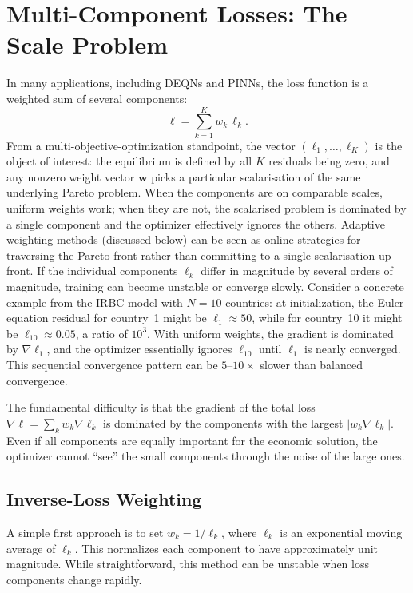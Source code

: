 \documentclass[11pt,a4paper]{report}
\begin{document}
\section{Multi-Component Losses: The Scale Problem}

In many applications, including DEQNs and PINNs, the loss function is a weighted sum of several components:
\begin{equation}
\ell = \sum_{k=1}^{K} w_k \, \ell_k.
\end{equation}
From a multi-objective-optimization standpoint, the vector $(\ell_1, \dots, \ell_K)$ is the object of interest: the equilibrium is defined by all $K$ residuals being zero, and any nonzero weight vector $\bm{w}$ picks a particular scalarisation of the same underlying Pareto problem.  When the components are on comparable scales, uniform weights work; when they are not, the scalarised problem is dominated by a single component and the optimizer effectively ignores the others.  Adaptive weighting methods (discussed below) can be seen as online strategies for traversing the Pareto front rather than committing to a single scalarisation up front.
If the individual components $\ell_k$ differ in magnitude by several orders of magnitude, training can become unstable or converge slowly.  Consider a concrete example from the IRBC model with $N=10$ countries: at initialization, the Euler equation residual for country~1 might be $\ell_1 \approx 50$, while for country~10 it might be $\ell_{10} \approx 0.05$, a ratio of $10^3$.  With uniform weights, the gradient is dominated by $\nabla \ell_1$, and the optimizer essentially ignores $\ell_{10}$ until $\ell_1$ is nearly converged.  This sequential convergence pattern can be $5$--$10\times$ slower than balanced convergence.

The fundamental difficulty is that the gradient of the total loss $\nabla \ell = \sum_k w_k \nabla \ell_k$ is dominated by the components with the largest $|w_k \nabla \ell_k|$.  Even if all components are equally important for the economic solution, the optimizer cannot ``see'' the small components through the noise of the large ones.

\subsection{Inverse-Loss Weighting}

A simple first approach is to set $w_k = 1/\bar{\ell}_k$, where $\bar{\ell}_k$ is an exponential moving average of $\ell_k$.  This normalizes each component to have approximately unit magnitude.  While straightforward, this method can be unstable when loss components change rapidly.
\end{document}

